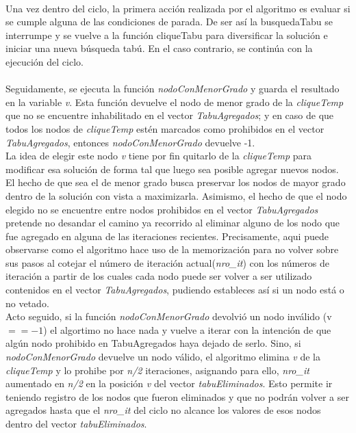 \paragraph{}
Una vez dentro del ciclo, la primera acción realizada por el algoritmo es evaluar si se cumple alguna de las condiciones de parada. De ser así  la busquedaTabu se interrumpe y se vuelve a la función cliqueTabu para diversificar la solución e iniciar una nueva búsqueda tabú. En el caso contrario, se continúa con la ejecución del ciclo.

\paragraph{}
Seguidamente, se ejecuta la función \textit{nodoConMenorGrado} y guarda el resultado en la variable \textit{v}. Esta función devuelve el nodo de menor grado de la \textit{cliqueTemp} que no se encuentre inhabilitado en el vector \textit{TabuAgregados}; y en caso de que todos los nodos de \textit{cliqueTemp} estén marcados como prohibidos en el vector \textit{TabuAgregados}, entonces \textit{nodoConMenorGrado} devuelve -1. \\
La idea de elegir este nodo \textit{v} tiene por fin quitarlo de la \textit{cliqueTemp} para modificar esa solución de forma tal que luego sea posible agregar nuevos nodos. El hecho de que sea el de menor grado busca preservar los nodos de mayor grado dentro de la solución con vista a maximizarla. Asimismo, el hecho de que el nodo elegido no se encuentre entre nodos prohibidos en el vector \textit{TabuAgregados} pretende no desandar el camino ya recorrido al eliminar alguno de los nodo que fue agregado en alguna de las iteraciones recientes. Precisamente, aqui puede observarse como el algoritmo hace uso de la memorización para no volver sobre sus pasos al cotejar el número de iteración actual(\textit{nro\_it}) con los números de iteración a partir de los cuales cada nodo puede ser volver a ser utilizado contenidos en el vector \textit{TabuAgregados}, pudiendo estableces así si un nodo está o no vetado. \\
Acto seguido, si la función \textit{nodoConMenorGrado} devolvió un nodo inválido (v $== -1$) el algortimo no hace nada y vuelve a iterar con la intención de que algún nodo prohibido en TabuAgregados haya dejado de serlo. Sino, si \textit{nodoConMenorGrado} devuelve un nodo válido, el algoritmo elimina \textit{v} de la \textit{cliqueTemp} y lo prohibe por \textit{n/2} iteraciones, asignando para ello, \textit{nro\_it} aumentado en  \textit{n/2} en la posición \textit{v} del vector \textit{tabuEliminados}. Esto permite ir teniendo registro de los nodos que fueron eliminados y que no podrán volver a ser agregados hasta que el \textit{nro\_it} del ciclo no alcance los valores de esos nodos dentro del vector \textit{tabuEliminados}.

